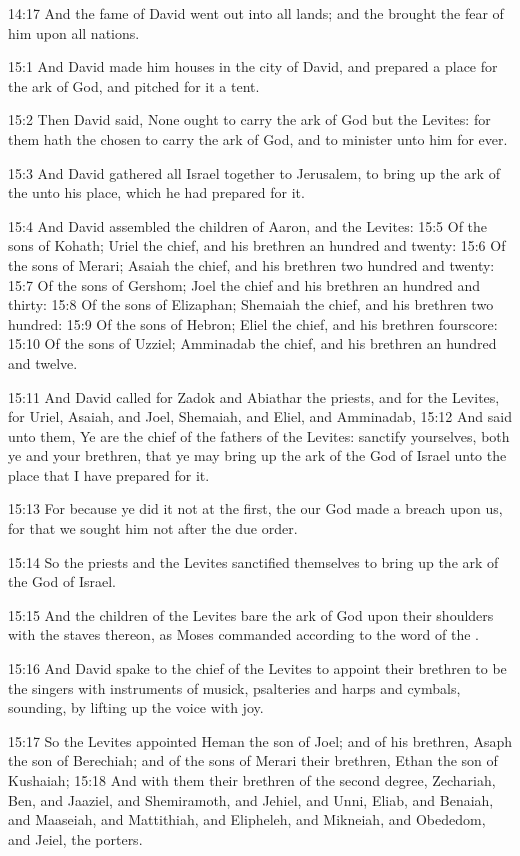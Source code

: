 14:17 And the fame of David went out into all lands; and the \LORD brought the fear of him upon all nations.

15:1 And David made him houses in the city of David, and prepared a place for the ark of God, and pitched for it a tent.

15:2 Then David said, None ought to carry the ark of God but the Levites: for them hath the \LORD chosen to carry the ark of God, and to minister unto him for ever.

15:3 And David gathered all Israel together to Jerusalem, to bring up the ark of the \LORD unto his place, which he had prepared for it.

15:4 And David assembled the children of Aaron, and the Levites: 15:5 Of the sons of Kohath; Uriel the chief, and his brethren an hundred and twenty: 15:6 Of the sons of Merari; Asaiah the chief, and his brethren two hundred and twenty: 15:7 Of the sons of Gershom; Joel the chief and his brethren an hundred and thirty: 15:8 Of the sons of Elizaphan; Shemaiah the chief, and his brethren two hundred: 15:9 Of the sons of Hebron; Eliel the chief, and his brethren fourscore: 15:10 Of the sons of Uzziel; Amminadab the chief, and his brethren an hundred and twelve.

15:11 And David called for Zadok and Abiathar the priests, and for the Levites, for Uriel, Asaiah, and Joel, Shemaiah, and Eliel, and Amminadab, 15:12 And said unto them, Ye are the chief of the fathers of the Levites: sanctify yourselves, both ye and your brethren, that ye may bring up the ark of the \LORD God of Israel unto the place that I have prepared for it.

15:13 For because ye did it not at the first, the \LORD our God made a breach upon us, for that we sought him not after the due order.

15:14 So the priests and the Levites sanctified themselves to bring up the ark of the \LORD God of Israel.

15:15 And the children of the Levites bare the ark of God upon their shoulders with the staves thereon, as Moses commanded according to the word of the \LORD.

15:16 And David spake to the chief of the Levites to appoint their brethren to be the singers with instruments of musick, psalteries and harps and cymbals, sounding, by lifting up the voice with joy.

15:17 So the Levites appointed Heman the son of Joel; and of his brethren, Asaph the son of Berechiah; and of the sons of Merari their brethren, Ethan the son of Kushaiah; 15:18 And with them their brethren of the second degree, Zechariah, Ben, and Jaaziel, and Shemiramoth, and Jehiel, and Unni, Eliab, and Benaiah, and Maaseiah, and Mattithiah, and Elipheleh, and Mikneiah, and Obededom, and Jeiel, the porters.

